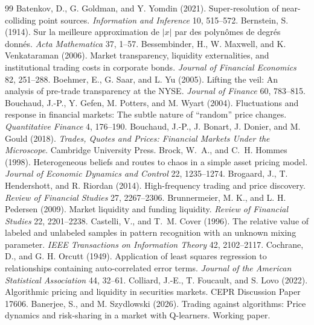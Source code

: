 \documentclass[12pt]{article}
\theoremstyle{definition}
\theoremstyle{remark}
\begin{document}
\begin{thebibliography}{99}
 Batenkov, D., G. Goldman, and Y. Yomdin (2021). Super-resolution of near-colliding point sources. \emph{Information and Inference} 10, 515--572.
 Bernstein, S. (1914). Sur la meilleure approximation de $|x|$ par des polyn\^omes de degr\'es donn\'es. \emph{Acta Mathematica} 37, 1--57.
 Bessembinder, H., W. Maxwell, and K. Venkataraman (2006). Market transparency, liquidity externalities, and institutional trading costs in corporate bonds. \emph{Journal of Financial Economics} 82, 251--288.
 Boehmer, E., G. Saar, and L. Yu (2005). Lifting the veil: An analysis of pre-trade transparency at the NYSE. \emph{Journal of Finance} 60, 783--815.
 Bouchaud, J.-P., Y. Gefen, M. Potters, and M. Wyart (2004). Fluctuations and response in financial markets: The subtle nature of ``random'' price changes. \emph{Quantitative Finance} 4, 176--190.
 Bouchaud, J.-P., J. Bonart, J. Donier, and M. Gould (2018). \emph{Trades, Quotes and Prices: Financial Markets Under the Microscope}. Cambridge University Press.
 Brock, W.~A., and C.~H. Hommes (1998). Heterogeneous beliefs and routes to chaos in a simple asset pricing model. \emph{Journal of Economic Dynamics and Control} 22, 1235--1274.
 Brogaard, J., T. Hendershott, and R. Riordan (2014). High-frequency trading and price discovery. \emph{Review of Financial Studies} 27, 2267--2306.
 Brunnermeier, M. K., and L. H. Pedersen (2009). Market liquidity and funding liquidity. \emph{Review of Financial Studies} 22, 2201--2238.
 Castelli, V., and T.~M. Cover (1996). The relative value of labeled and unlabeled samples in pattern recognition with an unknown mixing parameter. \emph{IEEE Transactions on Information Theory} 42, 2102--2117.
 Cochrane, D., and G. H. Orcutt (1949). Application of least squares regression to relationships containing auto-correlated error terms. \emph{Journal of the American Statistical Association} 44, 32--61.
 Colliard, J.-E., T. Foucault, and S. Lovo (2022). Algorithmic pricing and liquidity in securities markets. CEPR Discussion Paper 17606.
 Banerjee, S., and M. Szydlowski (2026). Trading against algorithms: Price dynamics and risk-sharing in a market with Q-learners. Working paper.

\end{thebibliography}
\end{document}
